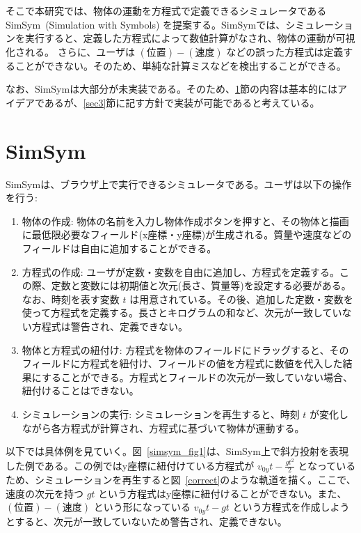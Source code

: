 \documentclass[11pt, a4paper, oneside, twocolumn, dvipdfmx]{jsarticle}
\newcommand{\simname}{SimSym}
\newcommand{\simnamealt}{Simulation with Symbols}
\begin{document}
そこで本研究では、物体の運動を方程式で定義できるシミュレータである \simname~(\simnamealt) を提案する。\simname では、シミュレーションを実行すると、定義した方程式によって数値計算がなされ、物体の運動が可視化される。
さらに、ユーザは $(\text{位置}) - (\text{速度})$ などの誤った方程式は定義することができない。そのため、単純な計算ミスなどを検出することができる。

なお、\simname は大部分が未実装である。そのため、\ref{sec2}節の内容は基本的にはアイデアであるが、\ref{sec3}節に記す方針で実装が可能であると考えている。

\section{\simname} \label{sec2}

\simname は、ブラウザ上で実行できるシミュレータである。ユーザは以下の操作を行う:

\begin{enumerate}
\item 物体の作成: 物体の名前を入力し物体作成ボタンを押すと、その物体と描画に最低限必要なフィールド(x座標・y座標)が生成される。質量や速度などのフィールドは自由に追加することができる。
\item 方程式の作成: ユーザが定数・変数を自由に追加し、方程式を定義する。この際、定数と変数には初期値と次元(長さ、質量等)を設定する必要がある。なお、時刻を表す変数 $t$ は用意されている。その後、追加した定数・変数を使って方程式を定義する。長さとキログラムの和など、次元が一致していない方程式は警告され、定義できない。
\item 物体と方程式の紐付け: 方程式を物体のフィールドにドラッグすると、そのフィールドに方程式を紐付け、フィールドの値を方程式に数値を代入した結果にすることができる。方程式とフィールドの次元が一致していない場合、紐付けることはできない。
\item シミュレーションの実行: シミュレーションを再生すると、時刻 $t$ が変化しながら各方程式が計算され、方程式に基づいて物体が運動する。
\end{enumerate}

以下では具体例を見ていく。図~\ref{simsym_fig1}は、\simname 上で斜方投射を表現した例である。この例ではy座標に紐付けている方程式が $v_{0y}t - \frac{gt^2}{2}$ となっているため、シミュレーションを再生すると図~\ref{correct}のような軌道を描く。ここで、速度の次元を持つ $gt$ という方程式はy座標に紐付けることができない。また、$(\text{位置}) - (\text{速度})$ という形になっている $v_{0y}t - gt$ という方程式を作成しようとすると、次元が一致していないため警告され、定義できない。
\end{document}
